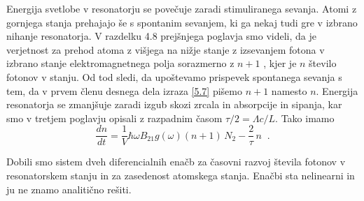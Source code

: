 Energija svetlobe v resonatorju se povečuje zaradi stimuliranega sevanja.
Atomi z gornjega stanja prehajajo še s spontanim seva\-njem, ki ga nekaj
tudi gre v izbrano nihanje resonatorja. V razdelku 4.8 prejšnjega poglavja
smo videli, da je verjetnost za prehod atoma z višjega na nižje stanje z
izsevanjem fotona v izbrano stanje elektromagnetnega polja sorazmerno z $n+1$%
, kjer je $n$ število fotonov v stanju. Od tod sledi, da upoštevamo
prispevek spontanega sevanja s tem, da v prvem členu desnega dela izraza 
\ref{5.7} pišemo $n+1$ namesto $n$. Energija resonatorja se zmanjšuje
zaradi izgub skozi zrcala in absorpcije in sipanja, kar smo v tretjem
poglavju opisali z razpadnim časom $\tau/2=\Lambda c/L$. Tako imamo 
\begin{equation}  \label{5.8}
\frac{dn}{dt}=\frac{1}{V}\hbar\omega B_{21}g(\omega)(n+1)\, N_2-\frac{2}{\tau%
}\,n\;\;.
\end{equation}

Dobili smo sistem dveh diferencialnih enačb za časovni razvoj števila
fotonov v resonatorskem stanju in za zasedenost atomskega stanja. Enačbi
sta nelinearni in ju ne znamo analitično rešiti.


